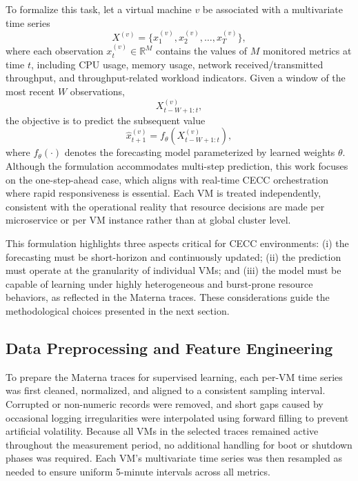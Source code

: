 \documentclass[a4paper,fleqn]{cas-dc}
\begin{document}
To formalize this task, let a virtual machine $v$ be associated with a multivariate time series
\begin{equation}
X^{(v)} = \{ x_1^{(v)}, x_2^{(v)}, \ldots, x_T^{(v)} \},
\end{equation}
where each observation $x_t^{(v)} \in \mathbb{R}^M$ contains the values of $M$ monitored metrics at time $t$, including CPU usage, memory usage, network received/transmitted throughput, and throughput-related workload indicators. Given a window of the most recent $W$ observations,
\begin{equation}
X^{(v)}_{t-W+1:t},
\end{equation}
the objective is to predict the subsequent value
\begin{equation}
\hat{x}_{t+1}^{(v)} = f_{\theta}\!\left(X^{(v)}_{t-W+1:t}\right),
\end{equation}
where $f_{\theta}(\cdot)$ denotes the forecasting model parameterized by learned weights $\theta$. Although the formulation accommodates multi-step prediction, this work focuses on the one-step-ahead case, which aligns with real-time CECC orchestration where rapid responsiveness is essential. Each VM is treated independently, consistent with the operational reality that resource decisions are made per microservice or per VM instance rather than at global cluster level.

This formulation highlights three aspects critical for CECC environments: (i) the forecasting must be short-horizon and continuously updated; (ii) the prediction must operate at the granularity of individual VMs; and (iii) the model must be capable of learning under highly heterogeneous and burst-prone resource behaviors, as reflected in the Materna traces. These considerations guide the methodological choices presented in the next section.

\subsection{Data Preprocessing and Feature Engineering}
\label{subsec:feature_engineering}

To prepare the Materna traces for supervised learning, each per-VM time series was first cleaned, normalized, and aligned to a consistent sampling interval. Corrupted or non-numeric records were removed, and short gaps caused by occasional logging irregularities were interpolated using forward filling to prevent artificial volatility. Because all VMs in the selected traces remained active throughout the measurement period, no additional handling for boot or shutdown phases was required. Each VM's multivariate time series was then resampled as needed to ensure uniform 5-minute intervals across all metrics.
\end{document}

